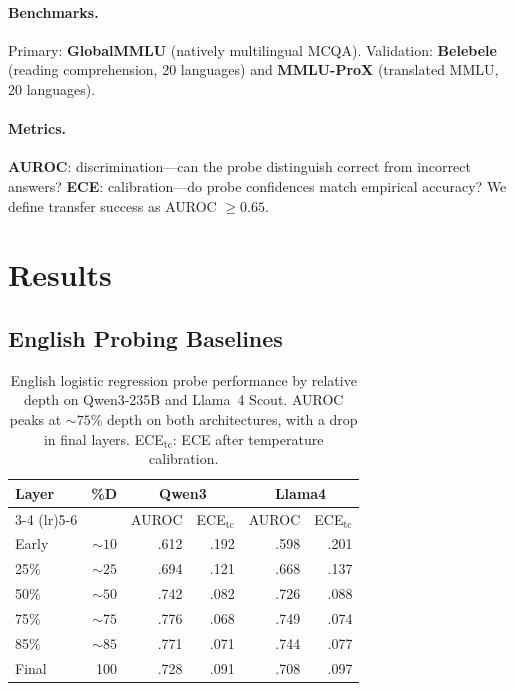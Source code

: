 \documentclass[11pt,a4paper]{article}
\begin{document}
\paragraph{Benchmarks.}
Primary: \textbf{GlobalMMLU} (natively multilingual MCQA).
Validation: \textbf{Belebele} (reading comprehension, 20 languages) and \textbf{MMLU-ProX} (translated MMLU, 20 languages).

\paragraph{Metrics.}
\textbf{AUROC}: discrimination---can the probe distinguish correct from incorrect answers?
\textbf{ECE}: calibration---do probe confidences match empirical accuracy?
We define transfer success as AUROC $\geq 0.65$.

\section{Results}

\subsection{English Probing Baselines}

\begin{table}[t]
\centering
\small
\begin{tabular}{lrrrrr}
\toprule
\textbf{Layer} & \textbf{\%D} & \multicolumn{2}{c}{\textbf{Qwen3}} & \multicolumn{2}{c}{\textbf{Llama4}} \\
\cmidrule(lr){3-4} \cmidrule(lr){5-6}
& & AUROC & ECE$_\text{tc}$ & AUROC & ECE$_\text{tc}$ \\
\midrule
Early  & ${\sim}10$ & .612 & .192 & .598 & .201 \\
25\%   & ${\sim}25$ & .694 & .121 & .668 & .137 \\
50\%   & ${\sim}50$ & .742 & .082 & .726 & .088 \\
75\%   & ${\sim}75$ & .776 & .068 & .749 & .074 \\
85\%   & ${\sim}85$ & .771 & .071 & .744 & .077 \\
Final  & 100 & .728 & .091 & .708 & .097 \\
\bottomrule
\end{tabular}
\caption{English logistic regression probe performance by relative depth on Qwen3-235B and Llama~4 Scout. AUROC peaks at ${\sim}75$\% depth on both architectures, with a drop in final layers. ECE$_\text{tc}$: ECE after temperature calibration.}
\label{tab:en_probes}
\end{table}
\end{document}
